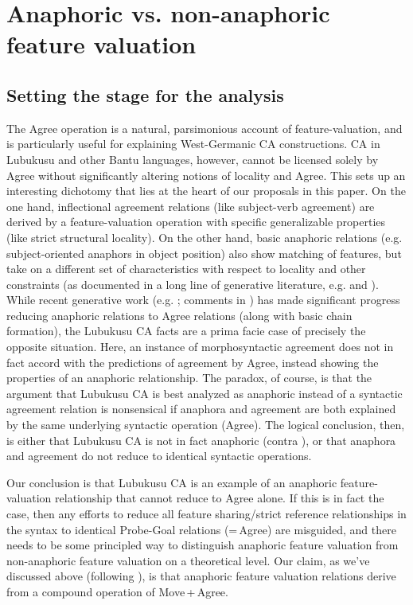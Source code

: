 \documentclass[output=paper
,modfonts
,nonflat
]{langsci/langscibook}
\begin{document}
\section{Anaphoric vs. non-anaphoric feature valuation} \label{AnalysisSection}

\subsection{Setting the stage for the analysis}

The Agree operation is a natural, parsimonious account of feature-valuation, and is particularly useful for explaining West-Germanic CA constructions. CA in Lubukusu and other Bantu languages, however, cannot be licensed solely by Agree without significantly altering notions of locality and Agree.  
This sets up an interesting dichotomy that lies at the heart of our proposals in this paper. On the one hand, inflectional agreement relations (like subject-verb agreement) are derived by a feature-valuation operation with specific generalizable properties (like strict structural locality). On the other hand, basic anaphoric relations (e.g. subject-oriented anaphors in object position) also show matching of features, but take on a different set of characteristics with respect to locality and other constraints (as documented in a long line of generative literature, e.g. \citealt{Chomsky:1981,Safir:2004,Reuland:2011} and ). While recent generative work (e.g. \citealt{Reuland:2011,Hicks:2009}; comments in \citealt{Wurmbrand:2011}) has made significant progress reducing anaphoric relations to Agree relations (along with basic chain formation), the Lubukusu CA facts are a prima facie case of precisely the opposite situation. Here, an instance of morphosyntactic agreement does not in fact accord with the predictions of agreement by Agree, instead showing the properties of an anaphoric relationship. The paradox, of course, is that the argument that Lubukusu CA is best analyzed as anaphoric instead of a syntactic agreement relation is nonsensical if anaphora and agreement are both explained by the same underlying syntactic operation (Agree). The logical conclusion, then, is either that Lubukusu CA is not in fact anaphoric (contra \citealt{Diercks:2013}), or that anaphora and agreement do not reduce to identical syntactic operations.

Our conclusion is that Lubukusu CA is an example of an anaphoric feature-valuation relationship that cannot reduce to Agree alone. If this is in fact the case, then any efforts to reduce all feature sharing/strict reference relationships in the syntax to identical Probe-Goal relations (=\,Agree) are misguided, and there needs to be some principled way to distinguish anaphoric feature valuation from non-anaphoric feature valuation on a theoretical level. Our claim, as we’ve discussed above (following \citealt{Rooryck:2011}), is that anaphoric feature valuation relations derive from a compound operation of Move\,+\,Agree.
\end{document}
